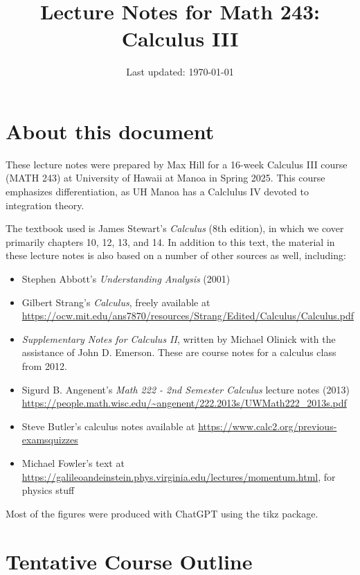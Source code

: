 \documentclass[10pt]{article}
\title{Lecture Notes for Math 243: \\ Calculus III}
\date{Last updated: \today}
\theoremstyle{definition}
\newcommand{\1}[1]{\textbf{1}_{\left[#1\right]}} %
\begin{document}
\maketitle
\tableofcontents
\newpage
\section*{About this document}

These lecture notes were prepared by Max Hill for a 16-week Calculus III course  (MATH
243) at University of Hawaii at Manoa in Spring 2025. This course emphasizes differentiation, as UH Manoa
has a Calclulus IV devoted to integration theory.

The textbook used is James Stewart's \textit{Calculus} (8th edition), in which we cover primarily
chapters 10, 12, 13, and 14. In addition to this text, the material in these lecture notes is also based
on a number of other sources as well, including:
\begin{itemize}
  \item Stephen Abbott's \textit{Understanding Analysis} (2001) 
  \item Gilbert Strang's \textit{Calculus}, freely available at
  \url{https://ocw.mit.edu/ans7870/resources/Strang/Edited/Calculus/Calculus.pdf}
  \item \textit{Supplementary Notes for Calculus II}, written by Michael Olinick
  with the assistance of John D. Emerson. These are course notes for a calculus
  class from 2012.
  \item Sigurd B. Angenent's \textit{Math 222 - 2nd Semester Calculus} lecture
  notes (2013)
  \url{https://people.math.wisc.edu/~angenent/222.2013s/UWMath222_2013s.pdf}
  \item Steve Butler's calculus notes available at
  \url{https://www.calc2.org/previous-examsquizzes}
  \item Michael Fowler's text at
  \url{https://galileoandeinstein.phys.virginia.edu/lectures/momentum.html}, for physics stuff
\end{itemize}
Most of the figures were produced with ChatGPT using the tikz package.

\newpage
\setcounter{section}{-1}
\section{Tentative Course Outline}
\end{document}
